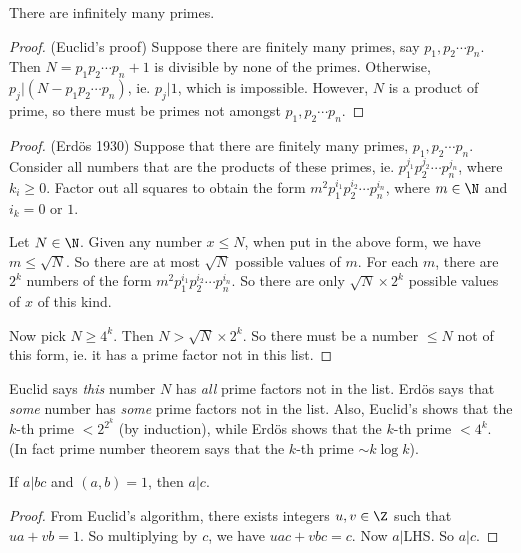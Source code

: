 \documentclass[a4paper]{article}
\begin{document}
  \begin{thm}
    There are infinitely many primes.
  \end{thm}

  \begin{proof}
    (Euclid's proof) Suppose there are finitely many primes, say $p_1, p_2 \cdots p_n$. Then $N = p_1p_2\cdots p_n + 1$ is divisible by none of the primes.  Otherwise, $p_j|(N - p_1p_2\cdots p_n)$, ie. $p_j|1$, which is impossible. However, $N$ is a product of prime, so there must be primes not amongst $p_1, p_2\cdots p_n$.
  \end{proof}

  \begin{proof}
    (Erd\"{o}s 1930) Suppose that there are finitely many primes, $p_1, p_2\cdots p_n$. Consider all numbers that are the products of these primes, ie. $p_1^{j_1}p_2^{j_2}\cdots p_n^{j_n}$, where $k_i \geq 0$. Factor out all squares to obtain the form $m^2p_1^{i_1}p_2^{i_2}\cdots p_n^{i_n}$, where $m\in \N$ and $i_k = 0$ or $1$.

    Let $N\in\N$. Given any number $x \leq N$, when put in the above form, we have $m \leq \sqrt{N}$. So there are at most $\sqrt{N}$ possible values of $m$. For each $m$, there are $2^k$ numbers of the form $m^2p_1^{i_1}p_2^{i_2}\cdots p_n^{i_n}$. So there are only $\sqrt{N}\times 2^k$ possible values of $x$ of this kind.

    Now pick $N\geq 4^k$. Then $N > \sqrt{N}\times 2^k$. So there must be a number $\leq N$ not of this form, ie. it has a prime factor not in this list.
  \end{proof}

  \note Euclid says \emph{this} number $N$ has \emph{all} prime factors not in the list. Erd\"{o}s says that \emph{some} number has \emph{some} prime factors not in the list. Also, Euclid's shows that the $k$-th prime $< 2^{2^k}$ (by induction), while Erd\"{o}s shows that the $k$-th prime $<4^k$. (In fact prime number theorem says that the $k$-th prime $\sim k\log k$).

  \begin{thm}
    If $a| bc$ and $(a, b) = 1$, then $a | c$.
  \end{thm}

  \begin{proof}
    From Euclid's algorithm, there exists integers $u, v\in \Z$ such that $ua + vb = 1$. So multiplying by $c$,  we have $uac + vbc = c$. Now $a | $LHS. So $a | c$.
  \end{proof}
\end{document}
